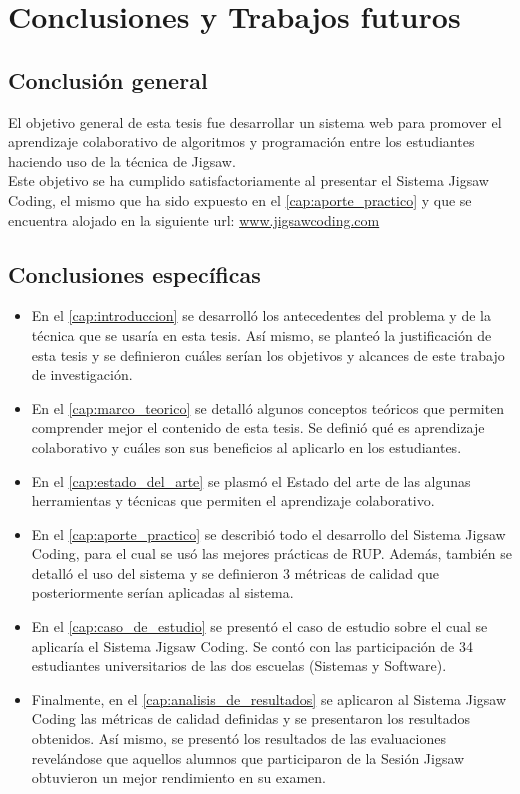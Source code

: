 \chapter{Conclusiones y Trabajos futuros}
\section{Conclusión general}
El objetivo general de esta tesis fue desarrollar un sistema web para promover el aprendizaje colaborativo de algoritmos y programación entre los estudiantes haciendo uso de la técnica de Jigsaw. \\

Este objetivo se ha cumplido satisfactoriamente al presentar el Sistema Jigsaw Coding, el mismo que ha sido expuesto en el \autoref{cap:aporte_practico} y que se encuentra alojado en la siguiente url: \url{www.jigsawcoding.com} 
\section{Conclusiones específicas}
\begin{itemize}
	\item En el \autoref{cap:introduccion} se desarrolló los antecedentes del problema y de la técnica que se usaría en esta tesis. Así mismo, se planteó la justificación de esta tesis y se definieron cuáles serían los objetivos y alcances de este trabajo de investigación.
	\item En el \autoref{cap:marco_teorico} se detalló algunos conceptos teóricos que permiten comprender mejor el contenido de esta tesis. Se definió qué es aprendizaje colaborativo y cuáles son sus beneficios al aplicarlo en los estudiantes.
	\item En el \autoref{cap:estado_del_arte} se plasmó el Estado del arte de las algunas herramientas y técnicas que permiten el aprendizaje colaborativo. 
	\item En el \autoref{cap:aporte_practico} se describió todo el desarrollo del Sistema Jigsaw Coding, para el cual se usó las mejores prácticas de RUP. Además, también se detalló el uso del sistema y se definieron 3 métricas de calidad que posteriormente serían aplicadas al sistema.
	\item En el \autoref{cap:caso_de_estudio} se presentó el caso de estudio sobre el cual se aplicaría el Sistema Jigsaw Coding. Se contó con las participación de 34 estudiantes universitarios de las dos escuelas (Sistemas y Software).
	\item Finalmente, en el \autoref{cap:analisis_de_resultados} se aplicaron al Sistema Jigsaw Coding las métricas de calidad definidas y se presentaron los resultados obtenidos. Así mismo, se presentó los resultados de las evaluaciones revelándose que aquellos alumnos que participaron de la Sesión Jigsaw obtuvieron un mejor rendimiento en su examen.
\end{itemize}

